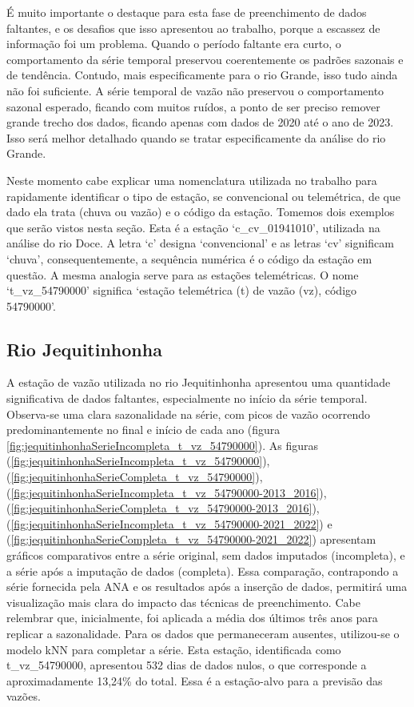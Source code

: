É muito importante o destaque para esta fase de preenchimento de dados faltantes, e os desafios que isso apresentou ao trabalho, porque a escassez de informação foi um problema. Quando o período faltante era curto, o comportamento da série temporal preservou coerentemente os padrões sazonais e de tendência. Contudo, mais especificamente para o rio Grande, isso tudo ainda não foi suficiente. A série temporal de vazão não preservou o comportamento sazonal esperado, ficando com muitos ruídos, a ponto de ser preciso remover grande trecho dos dados, ficando apenas com dados de 2020 até o ano de 2023. Isso será melhor detalhado quando se tratar especificamente da análise do rio Grande.

Neste momento cabe explicar uma nomenclatura utilizada no trabalho para rapidamente identificar o tipo de estação, se convencional ou telemétrica, de que dado ela trata (chuva ou vazão) e o código da estação. Tomemos dois exemplos que serão vistos nesta seção. Esta é a estação `c\_cv\_01941010', utilizada na análise do rio Doce. A letra `c' designa `convencional' e as letras `cv' significam `chuva', consequentemente, a sequência numérica é o código da estação em questão. A mesma analogia serve para as estações telemétricas. O nome `t\_vz\_54790000' significa `estação telemétrica (t) de vazão (vz), código 54790000'.

\subsection{Rio Jequitinhonha}

A estação de vazão utilizada no rio Jequitinhonha apresentou uma quantidade significativa de dados faltantes, especialmente no início da série temporal. Observa-se uma clara sazonalidade na série, com picos de vazão ocorrendo predominantemente no final e início de cada ano (figura \ref{fig:jequitinhonhaSerieIncompleta_t_vz_54790000}).
As figuras (\ref{fig:jequitinhonhaSerieIncompleta_t_vz_54790000}), (\ref{fig:jequitinhonhaSerieCompleta_t_vz_54790000}), (\ref{fig:jequitinhonhaSerieIncompleta_t_vz_54790000-2013_2016}), (\ref{fig:jequitinhonhaSerieCompleta_t_vz_54790000-2013_2016}), (\ref{fig:jequitinhonhaSerieIncompleta_t_vz_54790000-2021_2022}) e (\ref{fig:jequitinhonhaSerieCompleta_t_vz_54790000-2021_2022}) apresentam gráficos comparativos entre a série original, sem dados imputados (incompleta), e a série após a imputação de dados (completa). Essa comparação, contrapondo a série fornecida pela ANA e os resultados após a inserção de dados, permitirá uma visualização mais clara do impacto das técnicas de preenchimento. Cabe relembrar que, inicialmente, foi aplicada a média dos últimos três anos para replicar a sazonalidade. Para os dados que permaneceram ausentes, utilizou-se o modelo kNN para completar a série. Esta estação, identificada como t\_vz\_54790000, apresentou 532 dias de dados nulos, o que corresponde a aproximadamente 13,24\% do total. Essa é a estação-alvo para a previsão das vazões.

